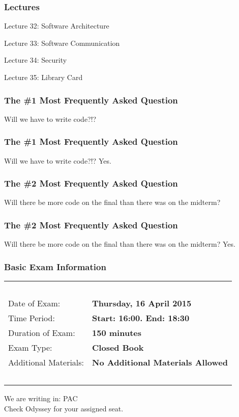 \begin{frame}
\frametitle{Lectures}
{\LARGE

Lecture 32: Software Architecture

Lecture 33: Software Communication

Lecture 34: Security

Lecture 35: Library Card
}

\end{frame}



\begin{frame}
\frametitle{The \#1 Most Frequently Asked Question}

{\LARGE
Will we have to write code?!?
}

\end{frame}

\begin{frame}
\frametitle{The \#1 Most Frequently Asked Question}

{\LARGE
Will we have to write code?!? \alert{Yes.}
}

\end{frame}

\begin{frame}
\frametitle{The \#2 Most Frequently Asked Question}

{\LARGE
Will there be more code on the final than there was on the midterm?
}

\end{frame}

\begin{frame}
\frametitle{The \#2 Most Frequently Asked Question}

{\LARGE
Will there be more code on the final than there was on the midterm? \alert{Yes.}
}

\end{frame}


\begin{frame}
\frametitle{Basic Exam Information}

\begin{table}[h]
 \begin{tabular}{|l l|}
        	\hline
			~ & ~ \\	
			Date of Exam: & \textbf{Thursday, 16 April 2015} \\
			Time Period: & \textbf{Start: 16:00. End: 18:30}\\
			Duration of Exam: & \textbf{150 minutes}\\
			Exam Type: & \textbf{Closed Book}\\
			Additional Materials: & \textbf{No Additional Materials Allowed}\\
			~ & ~\\
			\hline
          \end{tabular}
\end{table}

We are writing in: PAC\\
Check Odyssey for your assigned seat.

\end{frame}


